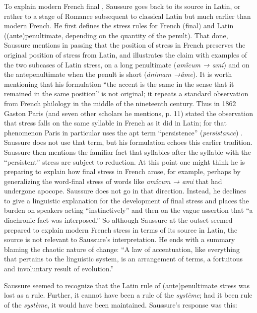 \documentclass[output=paper,
modfonts
]{LSP/langsci}
\begin{document}
To explain modern French final , Saussure goes back to its source
in Latin, or rather to a stage of Romance subsequent to classical Latin
but much earlier than modern French. He first defines the stress rules
for French (final) and Latin ((ante)penultimate, depending on the
quantity of the penult). That done, Saussure mentions in passing that
the position of stress in French preserves the original position of
stress from Latin, and illustrates the claim with examples of the two
subcases of Latin stress, on a long penultimate (\emph{amī́cum → ami}) and 
on the antepenultimate when the penult is short
(\emph{ánimam →âme}). It is worth mentioning that his formulation
``the accent is the same in the sense that it remained in the same
position'' is not original; it repeats a standard observation from
French philology in the middle of the nineteenth century. Thus in 1862
Gaston Paris (and seven other scholars he mentions, p. 11) stated the
observation that stress falls on the same syllable in French as it did
in Latin; for that phenomenon Paris in particular uses the apt term
``persistence'' (\emph{persistance}) \citep[28]{PA}. Saussure does not use
that term, but his formulation echoes this earlier tradition. Saussure
then mentions the familiar fact that syllables after the syllable with
the ``persistent'' stress are subject to reduction. At this point one
might think he is preparing to explain how final stress in French arose,
for example, perhaps by generalizing the word-final stress of words like
\emph{amī́cum → ami} that had undergone apocope. Saussure does not
go in that direction. Instead, he declines to give a linguistic
explanation for the development of final stress and places the burden on
speakers acting ``instinctively'' and then on the vague assertion that
``a diachronic fact was interposed.'' So although Saussure at the outset
seemed prepared to explain modern French stress in terms of its source
in Latin, the source is not relevant to Saussure's interpretation. He
ends with a summary blaming the chaotic nature of change: ``A law of
accentuation, like everything that pertains to the linguistic system, is
an arrangement of terms, a fortuitous and involuntary result of
evolution.''

Saussure seemed to recognize that the Latin rule of (ante)penultimate
stress was lost as a rule. Further, it cannot have been a rule of the
\emph{système}; had it been rule of the \emph{système}, it would have
been maintained. Saussure's response was this:
\end{document}
